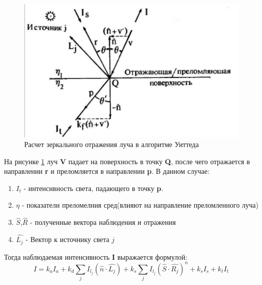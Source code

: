 \documentclass[a4paper,14pt, unknownkeysallowed]{extreport}
\begin{document}
\begin{figure}[h]
	\centering
	\includegraphics{global_reflections}
	\caption{Расчет зеркального отражения луча в алгоритме Уиттеда}
	\label{fig:global_reflections}
\end{figure} 

На рисунке  \ref{fig:global_reflections} луч \textbf{V} падает на поверхность в точку \textbf{Q}, после чего отражается в направлении \textbf{r} и преломляется
в направлении \textbf{p}.
В данном случае:
\begin{enumerate}
	\item $I_t$ - интенсивность света, падающего в точку \textbf{p}.
	\item $\eta$ - показатели преломелния сред(влияют на направление преломленного луча)
	\item $\hat{S}$,$\hat{R}$ - полученные вектора наблюдения и отражения
	\item $\hat{L_j}$ - Вектор к источнику света $j$

\end{enumerate}

Тогда наблюдаемая интенсивность \textbf{I} выражается формулой:
\begin{equation} 
	I = k_aI_a + k_d \sum_{j} I_{l_j}(\hat{n} \cdot \hat{L_j}) + k_s \sum_{j} I_{l_j}(\hat{S} \cdot \hat{R_j})^n + k_sI_s + k_tI_t
	\label{eq:intensivity}
\end{equation}
\end{document}
